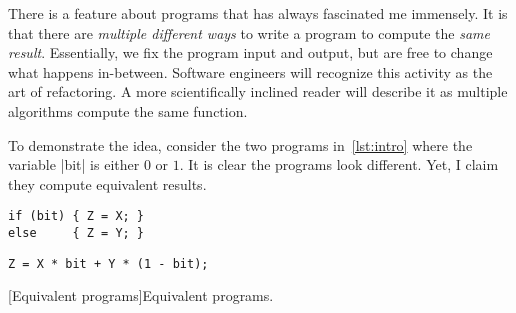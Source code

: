 
There is a feature about programs that has always fascinated me immensely.
It is that there are \emph{multiple different ways} to write a program to compute the \emph{same result}.
Essentially, we fix the program input and output, but are free to change what happens in-between.
Software engineers will recognize this activity as the art of refactoring.
A more scientifically inclined reader will describe it as multiple algorithms compute the same function.

To demonstrate the idea, consider the two programs in~\autoref{lst:intro} where the variable \pr|bit| is either \(0\) or \(1\).
It is clear the programs look different.
Yet, I claim they compute equivalent results.

\begin{minipage}{\textwidth}
\begin{center}
\captionsetup{type=lstlisting}
\begin{minipage}{.3\textwidth}
\begin{lstlisting}[nolol,label={p1},frame=none,numbers=none,aboveskip=0pt,belowskip=0pt]
if (bit) { Z = X; }
else     { Z = Y; }
\end{lstlisting}
\end{minipage}\hspace{3em}%
\begin{minipage}{.4\textwidth}
\captionsetup{type=lstlisting}
\begin{lstlisting}[nolol,label={p2},frame=none,numbers=none,aboveskip=0pt,belowskip=0pt]
Z = X * bit + Y * (1 - bit);
\end{lstlisting}
\end{minipage}
[Equivalent programs]{Equivalent programs.}
\label{lst:intro}
\end{center}
\end{minipage}

